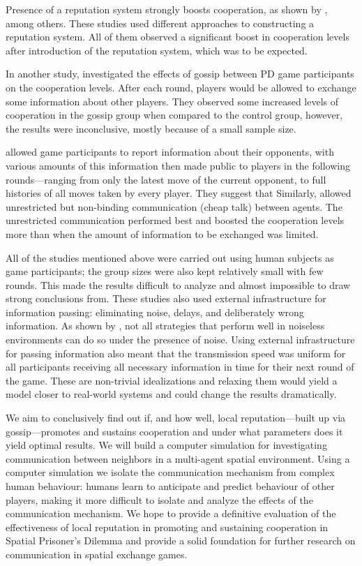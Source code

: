 \documentclass[english]{article}
\begin{document}
Presence of a reputation system strongly boosts cooperation, as shown by \citet{simple-reputation, dong-reputation}, among others.
These studies used different approaches to constructing a reputation system.
All of them observed a significant boost in cooperation levels after introduction of the reputation system, which was to be expected.

In another study, \citet{strangers-gossip} investigated the effects of gossip between PD game participants on the cooperation levels.
After each round, players would be allowed to exchange some information about other players.
They observed some increased levels of cooperation in the gossip group when compared to the control group, however, the results were inconclusive, mostly because of a small sample size.

\citet{public-private-monitoring} allowed game participants to report information about their opponents, with various amounts of this information then made public to players in the following rounds---ranging from only the latest move of the current opponent, to full histories of all moves taken by every player.
They suggest that 
Similarly, \citet{cooperation-communication} allowed unrestricted but non-binding communication (cheap talk) between agents. The unrestricted communication performed best and boosted the cooperation levels more than when the amount of information to be exchanged was limited.

All of the studies mentioned above were carried out using human subjects as game participants; the group sizes were also kept relatively small with few rounds.
This made the results difficult to analyze and almost impossible to draw strong conclusions from.
These studies also used external infrastructure for information passing: eliminating noise, delays, and deliberately wrong information.
As shown by \citet{noise}, not all strategies that perform well in noiseless environments can do so under the presence of noise.
Using external infrastructure for passing information also meant that
the transmission speed was uniform for all participants receiving all necessary information in time for their next round of the game.
These are non-trivial idealizations and relaxing them would yield a model closer to real-world systems and could change the results dramatically.

We aim to conclusively find out if, and how well, local reputation---built up via gossip---promotes and sustains cooperation and under what parameters does it yield optimal results.
We will build a computer simulation for investigating communication between neighbors in a multi-agent spatial environment.
Using a computer simulation we isolate the communication mechanism from complex human behaviour: humans learn to anticipate and predict behaviour of other players, making it more difficult to isolate and analyze the effects of the communication mechanism.
We hope to provide a definitive evaluation of the effectiveness of local reputation in promoting and sustaining cooperation in Spatial Prisoner’s Dilemma and provide a solid foundation for further research on communication in spatial exchange games.
\end{document}
